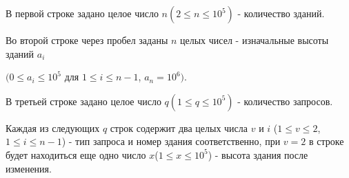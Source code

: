 В первой строке задано целое число $n(2 \le n \le 10^5)$ - количество зданий.

Во второй строке через пробел заданы $n$ целых чисел - изначальные высоты зданий $a_i$

$(0 \le a_i \le 10^5$ для $1 \le i \le n - 1$, $a_n = 10^6)$.

В третьей строке задано целое число $q(1 \le q \le 10^5)$ - количество запросов.

Каждая из следующих $q$ строк содержит два целых числа $v$ и $i$ ($1 \le v \le 2$, $1 \le i \le n - 1$) - тип запроса и номер здания соответственно, при $v = 2$ в строке будет находиться еще одно число $x$($1 \le x \le 10^5$) - высота здания после изменения.